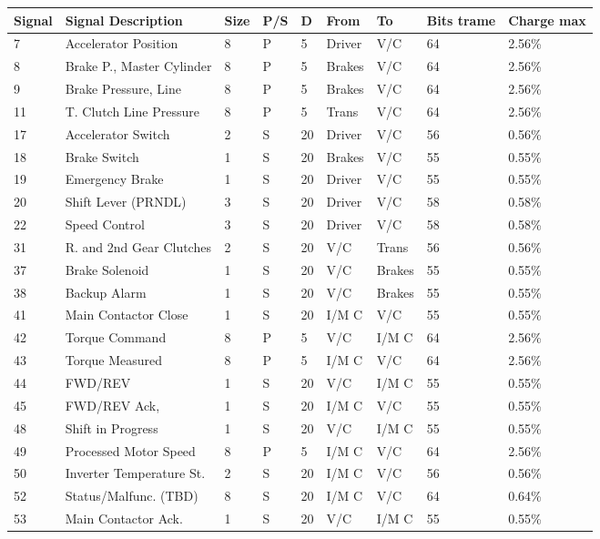 \documentclass[a4paper]{article}
\begin{document}
\begin{tabular}{|p{0.8cm}|p{4cm}|p{0.8cm}|p{0.8cm}|p{0.8cm}|p{1cm}|p{1cm}|p{1cm}|p{1cm}|}
\hline
Signal & Signal Description & Size & P/S & D & From 		& To & Bits trame & Charge max \\ \hline
7 & Accelerator Position & 8 & P & 5 & Driver & V/C 		& 64 & 2.56\% \\ \hline
8 & Brake P., Master Cylinder & 8 & P & 5 & Brakes & V/C& 64 & 2.56\% \\ \hline
9 & Brake Pressure, Line & 8 & P & 5 & Brakes & V/C 		& 64 & 2.56\% \\ \hline
11 & T. Clutch Line Pressure & 8 & P & 5 & Trans & V/C 	& 64 & 2.56\% \\ \hline
17 & Accelerator Switch & 2 & S & 20 & Driver & V/C 		& 56 & 0.56\% \\ \hline
18 & Brake Switch & 1 & S & 20 & Brakes & V/C 			& 55 & 0.55\% \\ \hline
19 & Emergency Brake & 1 & S & 20 & Driver & V/C 		& 55 & 0.55\% \\ \hline
20 & Shift Lever (PRNDL) & 3 & S & 20 & Driver & V/C 	& 58 & 0.58\% \\ \hline
22 & Speed Control & 3 & S & 20 & Driver & V/C 			& 58 & 0.58\% \\ \hline
31 & R. and 2nd Gear Clutches & 2 & S & 20 & V/C & Trans& 56 & 0.56\% \\ \hline
37 & Brake Solenoid & 1 & S & 20 & V/C & Brakes 			& 55 & 0.55\% \\ \hline
38 & Backup Alarm & 1 & S & 20 & V/C & Brakes 			& 55 & 0.55\% \\ \hline
41 & Main Contactor Close & 1 & S & 20 & I/M C & V/C 	& 55 & 0.55\% \\ \hline
42 & Torque Command & 8 & P & 5 & V/C & I/M C 			& 64 & 2.56\% \\ \hline
43 & Torque Measured & 8 & P & 5 & I/M C & V/C 			& 64 & 2.56\% \\ \hline
44 & FWD/REV & 1 & S & 20 & V/C & I/M C 					& 55 & 0.55\% \\ \hline
45 & FWD/REV Ack, & 1 & S & 20 & I/M C & V/C 			& 55 & 0.55\% \\ \hline
48 & Shift in Progress & 1 & S & 20 & V/C & I/M C 		& 55 & 0.55\% \\ \hline
49 & Processed Motor Speed & 8 & P & 5 & I/M C & V/C 	& 64 & 2.56\% \\ \hline
50 & Inverter Temperature St. & 2 & S & 20 & I/M C & V/C& 56 & 0.56\% \\ \hline
52 & Status/Malfunc. (TBD) & 8 & S & 20 & I/M C & V/C 	& 64 & 0.64\%  \\ \hline
53 & Main Contactor Ack. & 1 & S & 20 & V/C & I/M C 		& 55 & 0.55\% \\ \hline
\end{tabular} \\
\end{document}
